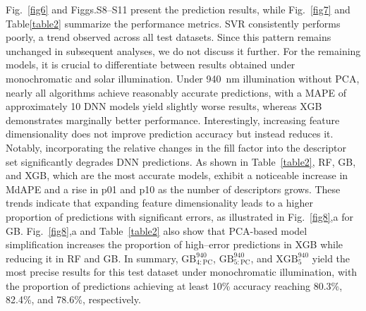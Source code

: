 \documentclass[a4paper,fleqn]{cas-sc}
\begin{document}
Fig.~\ref{fig6} and Figgs.S8--S11 present the prediction results,
while Fig.~\ref{fig7} and Table\ref{table2} summarize the performance metrics.
SVR consistently performs poorly, a trend observed across all test datasets.
Since this pattern remains unchanged in subsequent analyses, we do not discuss it further.
For the remaining models, it is crucial to differentiate between results obtained under monochromatic and solar illumination.
Under 940~nm illumination without PCA, nearly all algorithms achieve reasonably accurate predictions, with a MAPE of approximately 10%
DNN models yield slightly worse results, whereas XGB demonstrates marginally better performance.
Interestingly, increasing feature dimensionality does not improve prediction accuracy but instead reduces it.
Notably, incorporating the relative changes in the fill factor into the descriptor set significantly degrades DNN predictions.
As shown in Table~\ref{table2}, RF, GB, and XGB, which are the most accurate models, exhibit a noticeable increase
in MdAPE and a rise in p01 and p10 as the number of descriptors grows.
These trends indicate that expanding feature dimensionality leads to a higher proportion of predictions with significant errors,
as illustrated in Fig.~\ref{fig8},a for GB.
Fig.~\ref{fig8},a and Table~\ref{table2} also show that PCA-based model simplification increases the proportion of high--error predictions
in XGB while reducing it in RF and GB.
In summary, $\mathrm{GB}^{940}_\mathrm{4:PC}$, $\mathrm{GB}^{940}_\mathrm{5:PC}$,
and $\mathrm{XGB}^{940}_5$ yield the most precise results for this test dataset under monochromatic illumination,
with the proportion of predictions achieving at least 10\% accuracy reaching 80.3\%, 82.4\%, and 78.6\%, respectively.
\end{document}
